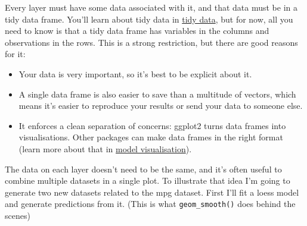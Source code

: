 
Every layer must have some data associated with it, and that data must
be in a tidy data frame. You'll learn about tidy data in
\hyperref[cha:data]{tidy data}, but for now, all you need to know is
that a tidy data frame has variables in the columns and observations in
the rows. This is a strong restriction, but there are good reasons for
it:  

\begin{itemize}
\item
  Your data is very important, so it's best to be explicit about it.
\item
  A single data frame is also easier to save than a multitude of
  vectors, which means it's easier to reproduce your results or send
  your data to someone else.
\item
  It enforces a clean separation of concerns: ggplot2 turns data frames
  into visualisations. Other packages can make data frames in the right
  format (learn more about that in \hyperref[sub:modelvis]{model
  visualisation}).
\end{itemize}

The data on each layer doesn't need to be the same, and it's often
useful to combine multiple datasets in a single plot. To illustrate that
idea I'm going to generate two new datasets related to the mpg dataset.
First I'll fit a loess model and generate predictions from it. (This is
what \texttt{geom\_smooth()} does behind the scenes)

\begin{Shaded}
\begin{Highlighting}[]
\StringTok{ }\StringTok{ } 
\StringTok{ }\NormalTok{(} \NormalTok{(} \NormalTok{))}
\StringTok{ } 

\CommentTok{#> }
\end{Highlighting}
\end{Shaded}

